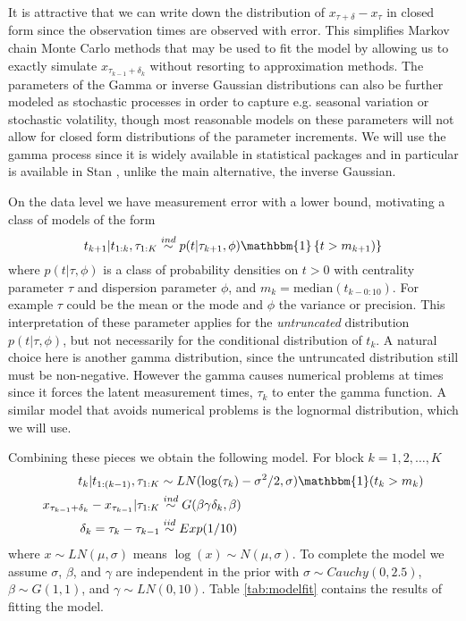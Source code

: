 \documentclass{article}
\begin{document}
It is attractive that we can write down the distribution of $x_{\tau + \delta} - x_\tau$ in closed form since the observation times are observed with error. This simplifies Markov chain Monte Carlo methods that may be used to fit the model by allowing us to exactly simulate $x_{\tau_{k-1} + \delta_k}$ without resorting to approximation methods. The parameters of the Gamma or inverse Gaussian distributions can also be further modeled as stochastic processes in order to capture e.g. seasonal variation or stochastic volatility, though most reasonable models on these parameters will not allow for closed form distributions of the parameter increments. We will use the gamma process since it is widely available in statistical packages and in particular is available in Stan \citep{stan-software:2015}, unlike the main alternative, the inverse Gaussian.

On the data level we have measurement error with a lower bound, motivating a class of models of the form 
\[
t_{k+1} |t_{1:k}, \tau_{1:K} \stackrel{ind}{\sim} p(t|\tau_{k+1}, \phi)\mathbbm{1}\left\{t > m_{k+1})\right\}
\]
where $p(t|\tau,\phi)$ is a class of probability densities on $t>0$ with centrality parameter $\tau$ and dispersion parameter $\phi$, and $m_k = \mathrm{median}(t_{k - 0:10})$. For example $\tau$ could be the mean or the mode and $\phi$ the variance or precision. This interpretation of these parameter applies for the {\it untruncated} distribution $p(t|\tau,\phi)$, but not necessarily for the conditional distribution of $t_k$. A natural choice here is another gamma distribution, since the untruncated distribution still must be non-negative. However the gamma causes numerical problems at times since it forces the latent measurement times, $\tau_k$ to enter the gamma function. A similar model that avoids numerical problems is the lognormal distribution, which we will use.

Combining these pieces we obtain the following model. For block $k=1,2,\dots,K$
\begin{align*}
t_k|t_{1:(k-1)}, \tau_{1:K} &\sim LN(\log(\tau_k) - \sigma^2/2, \sigma)\mathbbm{1}(t_k > m_k)\\
x_{\tau_{k-1} + \delta_k} - x_{\tau_{k-1}}|\tau_{1:K} & \stackrel{ind}{\sim} G(\beta\gamma\delta_k,\beta)\\
\delta_{k} = \tau_{k} - \tau_{k-1} &\stackrel{iid}{\sim} Exp(1/10)
\end{align*}
where $x\sim LN(\mu,\sigma)$ means $\log(x) \sim N(\mu,\sigma)$. To complete the model we assume $\sigma$, $\beta$, and $\gamma$ are independent in the prior with $\sigma \sim Cauchy(0, 2.5)$, $\beta \sim G(1, 1)$, and $\gamma \sim LN(0, 10)$. Table \ref{tab:modelfit} contains the results of fitting the model.
\end{document}
